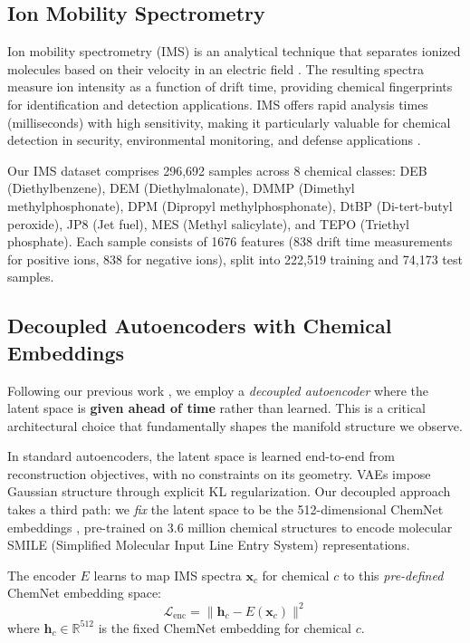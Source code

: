 \documentclass[sigconf]{acmart}
\begin{document}
\subsection{Ion Mobility Spectrometry}

Ion mobility spectrometry (IMS) is an analytical technique that separates ionized molecules based on their velocity in an electric field \cite{hill1990ion, dodds2019ion}. The resulting spectra measure ion intensity as a function of drift time, providing chemical fingerprints for identification and detection applications. IMS offers rapid analysis times (milliseconds) with high sensitivity, making it particularly valuable for chemical detection in security, environmental monitoring, and defense applications \cite{dodds2019ion}.

Our IMS dataset comprises 296,692 samples across 8 chemical classes: DEB (Diethylbenzene), DEM (Diethylmalonate), DMMP (Dimethyl methylphosphonate), DPM (Dipropyl methylphosphonate), DtBP (Di-tert-butyl peroxide), JP8 (Jet fuel), MES (Methyl salicylate), and TEPO (Triethyl phosphate). Each sample consists of 1676 features (838 drift time measurements for positive ions, 838 for negative ions), split into 222,519 training and 74,173 test samples.

\subsection{Decoupled Autoencoders with Chemical Embeddings}

Following our previous work \cite{dunham2024oracle}, we employ a \textit{decoupled autoencoder} where the latent space is \textbf{given ahead of time} rather than learned. This is a critical architectural choice that fundamentally shapes the manifold structure we observe.

In standard autoencoders, the latent space is learned end-to-end from reconstruction objectives, with no constraints on its geometry. VAEs impose Gaussian structure through explicit KL regularization. Our decoupled approach takes a third path: we \textit{fix} the latent space to be the 512-dimensional ChemNet embeddings \cite{preuer2019frechet}, pre-trained on 3.6 million chemical structures to encode molecular SMILE (Simplified Molecular Input Line Entry System) representations.

The encoder $E$ learns to map IMS spectra $\mathbf{x}_c$ for chemical $c$ to this \textit{pre-defined} ChemNet embedding space:
\begin{equation}
\mathcal{L}_{\text{enc}} = \|\mathbf{h}_c - E(\mathbf{x}_c)\|^2
\end{equation}
where $\mathbf{h}_c \in \mathbb{R}^{512}$ is the fixed ChemNet embedding for chemical $c$.
\end{document}
